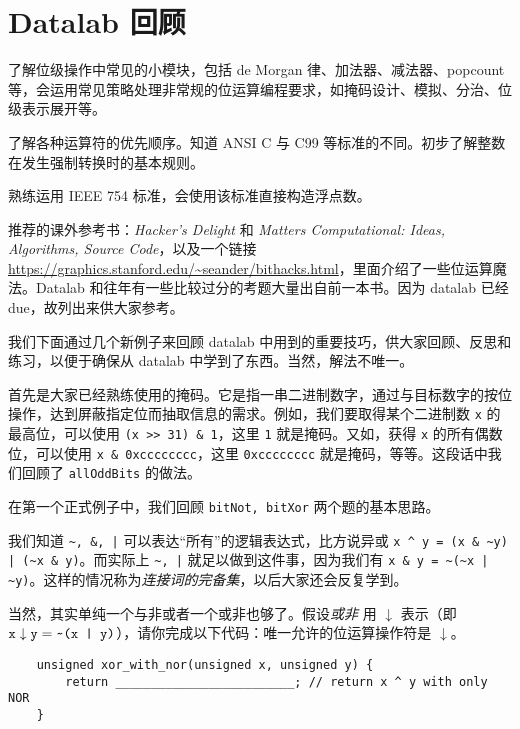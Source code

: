 \chapter{Datalab 回顾}
    \begin{summary}
        \begin{compactitem}
            \item 了解位级操作中常见的小模块，包括 de Morgan 律、加法器、减法器、popcount 等，会运用常见策略处理非常规的位运算编程要求，如掩码设计、模拟、分治、位级表示展开等。
            \item 了解各种运算符的优先顺序。知道 ANSI C 与 C99 等标准的不同。初步了解整数在发生强制转换时的基本规则。
            \item 熟练运用 IEEE 754 标准，会使用该标准直接构造浮点数。
            \item 推荐的课外参考书：\textit{Hacker's Delight} 和 \textit{Matters Computational: Ideas, Algorithms, Source Code}，以及一个链接 \url{https://graphics.stanford.edu/~seander/bithacks.html}，里面介绍了一些位运算魔法。Datalab 和往年有一些比较过分的考题大量出自前一本书。因为 datalab 已经 due，故列出来供大家参考。
        \end{compactitem}
    \end{summary}

    我们下面通过几个新例子来回顾 datalab 中用到的重要技巧，供大家回顾、反思和练习，以便于确保从 datalab 中学到了东西。当然，解法不唯一。

    首先是大家已经熟练使用的掩码。它是指一串二进制数字，通过与目标数字的按位操作，达到屏蔽指定位而抽取信息的需求。例如，我们要取得某个二进制数 \texttt{x} 的最高位，可以使用 \verb|(x >> 31) & 1|，这里 \texttt{1} 就是掩码。又如，获得 \texttt{x} 的所有偶数位，可以使用 \verb|x & 0xcccccccc|，这里 \texttt{0xcccccccc} 就是掩码，等等。这段话中我们回顾了 \texttt{allOddBits} 的做法。

    在第一个正式例子中，我们回顾 \texttt{bitNot, bitXor} 两个题的基本思路。
    \begin{example}[de Morgan 律]
        我们知道 \verb+~, &, |+ 可以表达“所有”的逻辑表达式，比方说异或 \verb+x ^ y = (x & ~y) | (~x & y)+。而实际上 \verb+~, |+ 就足以做到这件事，因为我们有 \verb+x & y = ~(~x | ~y)+。这样的情况称为\emph{连接词的完备集}，以后大家还会反复学到。

        当然，其实单纯一个与非或者一个或非也够了。假设\emph{或非} 用 $\downarrow$ 表示（即 $\texttt{x} \downarrow \texttt{y} = \verb+~(x | y)+$），请你完成以下代码：唯一允许的位运算操作符是 $\downarrow$。
        \begin{verbatim}
    unsigned xor_with_nor(unsigned x, unsigned y) {
        return _________________________; // return x ^ y with only NOR
    }
        \end{verbatim}
    \end{example}

